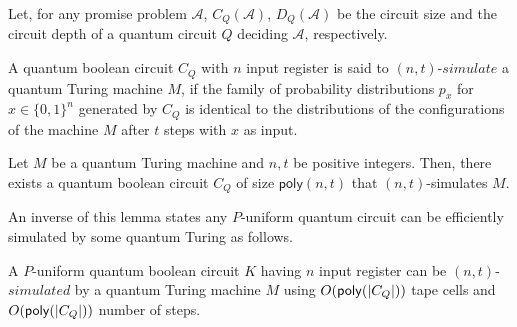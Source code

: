 \documentclass[11pt]{article}
\newcommand{\ms}[1]{\mathsf{#1}}
\begin{document}
Let, for any promise problem $\mathcal{A}$, $C_Q(\mathcal{A})$, $D_Q(\mathcal{A})$ be the circuit size and the circuit depth of a quantum circuit $Q$ deciding $\mathcal{A}$, respectively.
\begin{definition}
     A quantum boolean circuit $C_Q$ with $n$ input register is said to $(n,t)$-$simulate$ a quantum Turing machine $M$, if the family of probability distributions $p_x$ for $x\in \{0,1\}^n$ generated by $C_Q$ is identical to the distributions of the configurations of the machine $M$ after $t$ steps with $x$ as input.
\end{definition}
\begin{lemma}
     Let $M$ be a quantum Turing machine and $n,t$ be positive integers. Then, there exists a quantum boolean circuit $C_Q$ of size $\mathsf{poly}(n,t)$ that $(n,t)$-simulates $M$.
\end{lemma}

An inverse of this lemma states any $P$-uniform quantum circuit can be efficiently simulated by some quantum Turing as follows.

\begin{lemma}
     A $P$-uniform quantum boolean circuit $K$ having $n$ input register can be $(n,t)$-$simulated$ by a quantum Turing machine $M$ using $O(\mathsf{poly}(|C_Q|))$ tape cells and $O(\mathsf{poly}(|C_Q|))$ number of steps.
\end{lemma}
\end{document}

